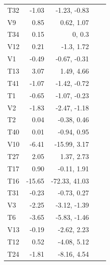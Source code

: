 \documentclass[
]{article}
\begin{document}
\begin{longtable}[t]{lrrrr}
\hspace{1em}T32 & -1.03 & -1.23, -0.83 &  & \\
\hspace{1em}V9 & 0.85 & 0.62, 1.07 &  & \\
\hspace{1em}T34 & 0.15 & 0, 0.3 &  & \\
\hspace{1em}V12 & 0.21 & -1.3, 1.72 &  & \\
\hspace{1em}V1 & -0.49 & -0.67, -0.31 &  & \\
\hspace{1em}T13 & 3.07 & 1.49, 4.66 &  & \\
\hspace{1em}T41 & -1.07 & -1.42, -0.72 &  & \\
\hspace{1em}T1 & -0.65 & -1.07, -0.23 &  & \\
\hspace{1em}V2 & -1.83 & -2.47, -1.18 &  & \\
\hspace{1em}T2 & 0.04 & -0.38, 0.46 &  & \\
\hspace{1em}T40 & 0.01 & -0.94, 0.95 &  & \\
\hspace{1em}V10 & -6.41 & -15.99, 3.17 &  & \\
\hspace{1em}T27 & 2.05 & 1.37, 2.73 &  & \\
\hspace{1em}T17 & 0.90 & -0.11, 1.91 &  & \\
\hspace{1em}T16 & -15.65 & -72.33, 41.03 &  & \\
\hspace{1em}T31 & -0.23 & -0.73, 0.27 &  & \\
\hspace{1em}V3 & -2.25 & -3.12, -1.39 &  & \\
\hspace{1em}T6 & -3.65 & -5.83, -1.46 &  & \\
\hspace{1em}V13 & -0.19 & -2.62, 2.23 &  & \\
\hspace{1em}T12 & 0.52 & -4.08, 5.12 &  & \\
\hspace{1em}T24 & -1.81 & -8.16, 4.54 &  & \\

\end{longtable}
\end{document}
